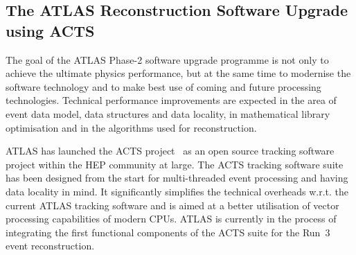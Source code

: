 
\subsection{The ATLAS Reconstruction Software Upgrade using ACTS}

The goal of the ATLAS Phase-2 software upgrade programme is not only to achieve the ultimate physics performance, but at the same time to modernise the software technology and to make best use of coming and future processing technologies. Technical performance improvements are expected in the area of event data model, data structures and data locality, in mathematical library optimisation and in the algorithms used for reconstruction.
%

ATLAS has launched the ACTS project~\cite{ACTS} as an open source tracking software project within the HEP community at large. The ACTS tracking software suite has been designed from the start for multi-threaded event processing and having data locality in mind. It significantly simplifies the technical overheads w.r.t. the current ATLAS tracking software and is aimed at a better utilisation of vector processing capabilities of modern CPUs. ATLAS is currently in the process of integrating the first functional components of the ACTS suite for the Run~3 event reconstruction. 


